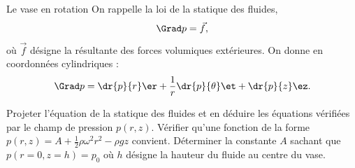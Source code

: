 \begin{exo}[PC][2][TD]{Le vase en rotation}
 On rappelle la loi de la statique des fluides,
\begin{equation}
     \Grad p = \Vec{f},
\end{equation}
 où $\Vec{f}$ désigne la résultante des forces volumiques extérieures.
 On donne en coordonnées cylindriques :
\begin{equation}
\Grad p = \dr{p}{r} \er + \frac{1}{r}\dr{p}{\theta} \et +  \dr{p}{z} \ez .
\end{equation}
  \begin{quest}
  \item Projeter l'équation de la statique des fluides et en déduire les équations vérifiées par le champ de pression $p(r,z)$. Vérifier qu'une fonction de la forme $p(r,z) = A + \frac{1}{2}\rho \omega^2 r^2 - \rho g z$ convient. Déterminer la constante $A$ sachant que $p(r=0,z=h) = p_0$ où $h$ désigne la hauteur du fluide au centre du vase.


\end{quest}
\end{exo}
